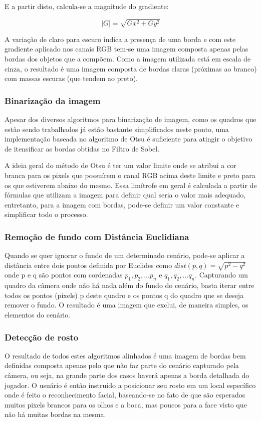 \documentclass[a4paper]{article}
\begin{document}
E a partir disto, calcula-se a magnitude do gradiente:

$$
|G|=\sqrt{Gx^2 + Gy^2}
$$	

A variação de claro para escuro indica a presença de uma borda e com este gradiente aplicado nos canais RGB tem-se uma imagem composta apenas pelas bordas dos objetos que a compõem. Como a imagem utilizada está em escala de cinza, o resultado é uma imagem composta de bordas claras (próximas ao branco) com massas escuras (que tendem ao preto).

\subsubsection{Binarização da imagem}

Apesar dos diversos algoritmos para binarização de imagem, como os quadros que estão sendo trabalhados já estão bastante simplificados neste ponto, uma implementação baseada no algoritmo de Otsu é suficiente para atingir o objetivo de itensificar as bordas obtidas no Filtro de Sobel.

A ideia geral do método de Otsu é ter um valor limite onde se atribui a cor branca para os pixels que possuírem o canal RGB acima deste limite e preto para os que estiverem abaixo do mesmo. Essa limítrofe em geral é calculada a partir de fórmulas que utilizam a imagem para definir qual seria o valor mais adequado, entretanto, para a imagem com bordas, pode-se definir um valor constante e simplificar todo o processo.

\subsubsection{Remoção de fundo com Distância Euclidiana}

Quando se quer ignorar o fundo de um determinado cenário, pode-se aplicar a distância entre dois pontos definida por Euclides como $dist(p, q) = \sqrt{p^2 - q^2}$ onde p e q são pontos com cordenadas $p_{1}, p_{2}, ... p_{n}$ e $q_{1}, q_{2}, ... q_{n}$. Capturando um quadro da câmera onde não há nada além do fundo do cenário, basta iterar entre todos os pontos (pixels) p deste quadro e os pontos q do quadro que se deseja remover o fundo. O resultado é uma imagem que exclui, de maneira simples, os elementos do cenário.

\subsubsection{Detecção de rosto}
O resultado de todos estes algoritmos alinhados é uma imagem de bordas bem definidas composta apenas pelo que não faz parte do cenário capturado pela câmera, ou seja, na grande parte dos casos haverá apenas a borda detalhada do jogador. O usuário é então instruído a posicionar seu rosto em um local específico onde é feito o reconhecimento facial, baseando-se no fato de que são esperados muitos pixels brancos para os olhos e a boca, mas poucos para a face visto que não há muitas bordas na mesma.
\end{document}
